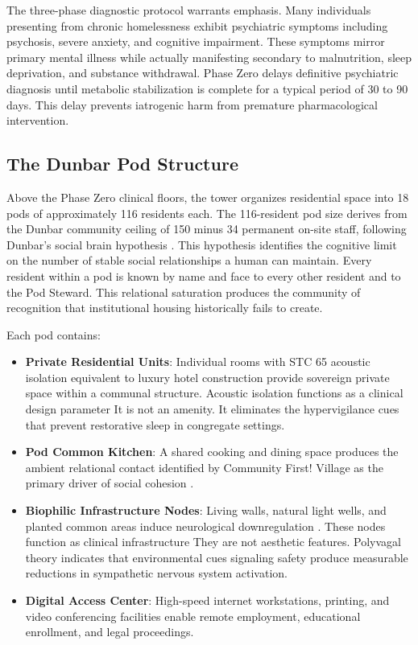 \documentclass[12pt, letterpaper]{article}
\begin{document}
The three-phase diagnostic protocol warrants emphasis. Many individuals presenting from chronic homelessness exhibit psychiatric symptoms including psychosis, severe anxiety, and cognitive impairment. These symptoms mirror primary mental illness while actually manifesting secondary to malnutrition, sleep deprivation, and substance withdrawal. Phase Zero delays definitive psychiatric diagnosis until metabolic stabilization is complete for a typical period of 30 to 90 days. This delay prevents iatrogenic harm from premature pharmacological intervention.

\subsection{The Dunbar Pod Structure}

Above the Phase Zero clinical floors, the tower organizes residential space into 18 pods of approximately 116 residents each. The 116-resident pod size derives from the Dunbar community ceiling of 150 minus 34 permanent on-site staff, following Dunbar's social brain hypothesis \citep{dunbar_1992}. This hypothesis identifies the cognitive limit on the number of stable social relationships a human can maintain. Every resident within a pod is known by name and face to every other resident and to the Pod Steward. This relational saturation produces the community of recognition that institutional housing historically fails to create.

Each pod contains:

\begin{itemize}
    \item \textbf{Private Residential Units}: Individual rooms with STC 65 acoustic isolation equivalent to luxury hotel construction provide sovereign private space within a communal structure. Acoustic isolation functions as a clinical design parameter It is not an amenity. It eliminates the hypervigilance cues that prevent restorative sleep in congregate settings.
    \item \textbf{Pod Common Kitchen}: A shared cooking and dining space produces the ambient relational contact identified by Community First! Village as the primary driver of social cohesion \citep{mlf_2024}.
    \item \textbf{Biophilic Infrastructure Nodes}: Living walls, natural light wells, and planted common areas induce neurological downregulation \citep{porges_2011}. These nodes function as clinical infrastructure They are not aesthetic features. Polyvagal theory indicates that environmental cues signaling safety produce measurable reductions in sympathetic nervous system activation.
    \item \textbf{Digital Access Center}: High-speed internet workstations, printing, and video conferencing facilities enable remote employment, educational enrollment, and legal proceedings.
\end{itemize}
\end{document}
